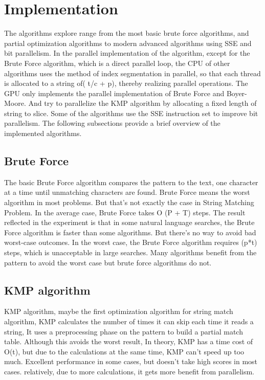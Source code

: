 \documentclass[11pt]{article}       %
\begin{document}
\section{Implementation} \label{proposedSolution}

The algorithms explore range from the most basic brute force algorithms, and partial optimization algorithms to modern advanced algorithms using SSE and bit parallelism. In the parallel implementation of the algorithm, except for the Brute Force algorithm, which is a direct parallel loop, the CPU of other algorithms uses the method of index segmentation in parallel, so that each thread is allocated to a string of( t/c + p), thereby realizing parallel operations. The GPU only implements the parallel implementation of Brute Force and Boyer-Moore. And try to parallelize the KMP algorithm by allocating a fixed length of string to slice. Some of the algorithms use the SSE instruction set to improve bit parallelism. The following subsections provide a brief overview of the implemented algorithms.


\subsection{Brute Force}\label{bf}
The basic Brute Force algorithm compares the pattern to the text, one character at a time until unmatching characters are found. Brute Force means the worst algorithm in most problems. But that's not exactly the case in String Matching Problem. In the average case, Brute Force takes O (P + T) steps. The result reflected in the experiment is that in some natural language searches, the Brute Force algorithm is faster than some algorithms. But there's no way to avoid bad worst-case outcomes. In the worst case, the Brute Force algorithm requires (p*t) steps, which is unacceptable in large searches. Many algorithms benefit from the pattern to avoid the worst case but brute force algorithms do not.

\subsection{KMP algorithm}\label{kmp}
KMP algorithm, maybe the first optimization algorithm\cite{KMP} for string match algorithm, KMP calculates the number of times it can skip each time it reads a string, It uses a preprocessing phase on the pattern to build a partial match table. Although this avoids the worst result, In theory, KMP has a time cost of O(t), but due to the calculations at the same time, KMP can’t speed up too much. Excellent performance in some cases, but doesn’t take high scores in most cases. relatively, due to more calculations, it gets more benefit from parallelism.
\end{document}
